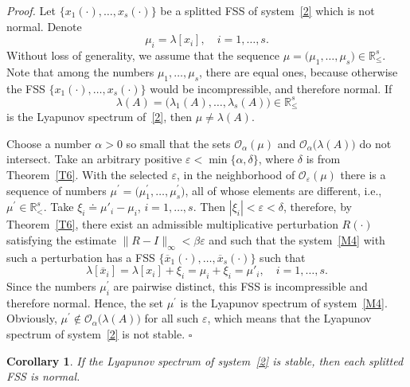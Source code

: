 \documentclass[11pt]{article}
\newtheorem{corollary}[theorem]{Corollary}
\begin{document}
\emph{Proof.}
Let $\bigl\{x_{1}(\cdot ),\dots ,x_{s}(\cdot )\bigr\}$ be a splitted FSS of system~\eqref{2}
which is not normal. 
Denote 
\begin{equation*}
\mu _{i}=\lambda [ x_{i}] ,\quad i=1,\dots ,s.
\end{equation*}%
Without loss of generality, we assume that the sequence $\mu =\bigl(\mu
_{1},\dots ,\mu _{s}\bigr)\in \mathbb{R}_{\leqslant }^{s}$. Note that among
the numbers $\mu _{1},\dots ,\mu _{s}$, there are equal ones, because
otherwise the FSS $\bigl\{x_{1}(\cdot ),\dots ,x_{s}(\cdot )\bigr\}$ would
be incompressible, and therefore normal. If 
\begin{equation*}
\lambda (A)=\bigl(\lambda _{1}(A),\ldots ,\lambda _{s}(A)\bigr)\in \mathbb{R}%
_{\leqslant }^{s}
\end{equation*}%
is the Lyapunov spectrum of~\eqref{2}, then $\mu \neq \lambda (A)$.

Choose a number $\alpha >0$ so small that the sets 
${\mathcal{O}}_{\alpha}(\mu )$ and ${\mathcal{O}}_{\alpha }\bigl(\lambda (A)\bigr)$ do not
intersect. Take an arbitrary positive $\varepsilon <\min \{\alpha ,\delta \}$, 
where $\delta $ is from Theorem~\ref{T6}. With the selected $\varepsilon$,
in the neighborhood of ${\mathcal{O}}_{\varepsilon }(\mu )$ there is a
sequence of numbers $\mu ^{\prime }=\bigl(\mu _{1}^{\prime },\dots ,\mu_{s}^{\prime }\bigr)$, 
all of whose elements are different, i.e., $\mu^{\prime }\in \mathbb{R}_{<}^{s}$. 
Take 
$\xi_i\doteq\mu'_i-\mu_i$, $i=1,\dots,s$. 
Then $|\xi_i|<\varepsilon<\delta$, therefore, by Theorem~\ref{T6}, there exist an admissible multiplicative perturbation 
$R(\cdot)$ satisfying the estimate 
$\|R-I\|_{\infty}<\beta\varepsilon$ and such that the system~\eqref{M4} with
such a perturbation has a FSS $\bigl\{\overline{x}_{1}(\cdot),\dots,\overline{x}_{s}(\cdot)\bigr\}$ 
such that 
\begin{equation*}
\lambda[\overline{x}_{i}]=\lambda[{x}_{i}]+\xi_i=\mu_i+\xi_i=\mu'_{i},\quad i=1,\dots,s.
\end{equation*}
 Since the numbers $\mu _{i}^{\prime }$
are pairwise distinct, this FSS is incompressible and therefore normal.
Hence, the set $\mu ^{\prime }$ is the Lyapunov spectrum of system~\eqref{M4}. 
Obviously, $\mu ^{\prime }\not\in {\mathcal{O}}_{\alpha }\bigl(\lambda (A)\bigr)$ 
for all such $\varepsilon $, which means that the Lyapunov spectrum
of system~\eqref{2} is not stable.
\hfill $\square$

\begin{corollary}
\label{sled}
\it
If the Lyapunov spectrum of system~\eqref{2} is stable, then each splitted
FSS is normal.
\end{corollary}
\end{document}
